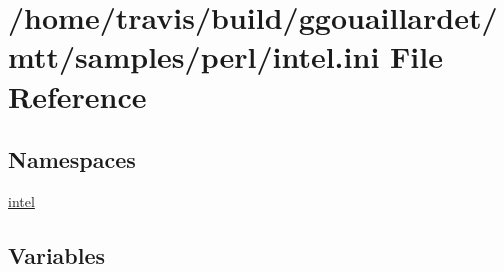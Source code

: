 \hypertarget{intel_8ini}{\section{/home/travis/build/ggouaillardet/mtt/samples/perl/intel.ini File Reference}
\label{intel_8ini}
}
\subsection*{Namespaces}
\begin{DoxyCompactItemize}
\item 
\hyperlink{namespaceintel}{intel}
\end{DoxyCompactItemize}
\subsection*{Variables}
